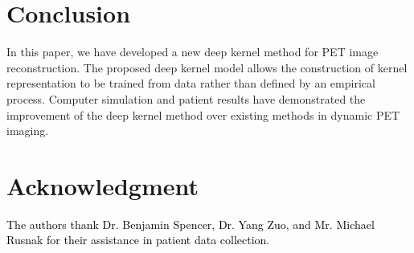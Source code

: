 \documentclass[]{IEEETran}
\newcommand{\txtb}[1]{\textcolor{black}{#1}}
\begin{document}
	\section{Conclusion}
	
	In this paper, we have developed a new deep kernel method for PET image reconstruction. The proposed deep kernel model allows the construction of kernel representation to be trained from data rather than defined by an empirical process. Computer simulation and patient results have demonstrated the improvement of the deep kernel method over existing methods in dynamic PET imaging. 
	
	\section*{Acknowledgment}
	
	\txtb{The authors thank Dr. Benjamin Spencer, Dr. Yang Zuo, and Mr. Michael Rusnak for their assistance in patient data collection.}
	
\end{document}
